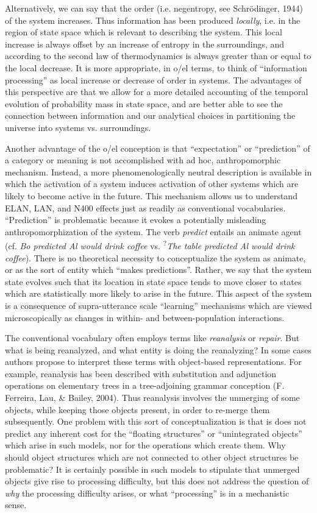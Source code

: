 Alternatively, we can say that the order (i.e. negentropy, see Schrödinger, 1944) of the system increases. Thus information has been produced \textit{locally}, i.e. in the region of state space which is relevant to describing the system. This local increase is always offset by an increase of entropy in the surroundings, and according to the second law of thermodynamics is always greater than or equal to the local decrease. It is more appropriate, in o/el terms, to think of “information processing” as local increase or decrease of order in systems. The advantages of this perspective are that we allow for a more detailed accounting of the temporal evolution of probability mass in state space, and are better able to see the connection between information and our analytical choices in partitioning the universe into systems vs. surroundings. 

Another advantage of the o/el conception is that “expectation” or “prediction” of a category or meaning is not accomplished with ad hoc, anthropomorphic mechanism. Instead, a more phenomenologically neutral description is available in which the activation of a system induces activation of other systems which are likely to become active in the future. This mechanism allows us to understand ELAN, LAN, and N400 effects just as readily as conventional vocabularies. “Prediction” is problematic because it evokes a potentially misleading anthropomorphization of the system. The verb \textit{predict} entails an animate agent (cf. \textit{Bo predicted Al would drink coffee} vs. \textsuperscript{?}\textit{The table predicted Al would drink coffee}). There is no theoretical necessity to conceptualize the system as animate, or as the sort of entity which “makes predictions”. Rather, we say that the system state evolves such that its location in state space tends to move closer to states which are statistically more likely to arise in the future. This aspect of the system is a consequence of supra-utterance scale “learning” mechanisms which are viewed microscopically as changes in within- and between-population interactions.

The conventional vocabulary often employs terms like \textit{reanalysis} or \textit{repair}. But what is being reanalyzed, and what entity is doing the reanalyzing? In some cases authors propose to interpret these terms with object-based representations. For example, reanalysis has been described with substitution and adjunction operations on elementary trees in a tree-adjoining grammar conception (F. Ferreira, Lau, \& Bailey, 2004). Thus reanalysis involves the unmerging of some objects, while keeping those objects present, in order to re-merge them subsequently. One problem with this sort of conceptualization is that is does not predict any inherent cost for the “floating structures” or “unintegrated objects” which arise in such models, nor for the operations which create them. Why should object structures which are not connected to other object structures be problematic? It is certainly possible in such models to stipulate that unmerged objects give rise to processing difficulty, but this does not address the question of \textit{why} the processing difficulty arises, or what “processing” is in a mechanistic sense.

